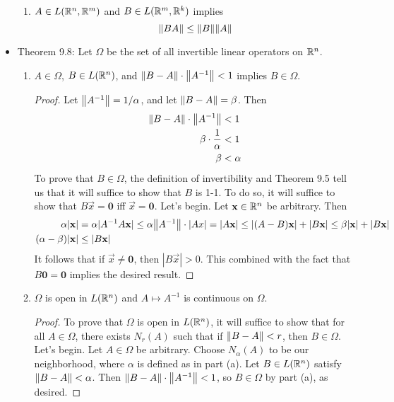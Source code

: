 \documentclass[../notes.tex]{subfiles}
\begin{document}
\begin{itemize}
\begin{enumerate}[label={(\alph*)}]
        \item $A\in L(\mathbb{R}^n,\mathbb{R}^m)$ and $B\in L(\mathbb{R}^m,\mathbb{R}^k)$ implies
        \begin{equation*}
            \norm{BA} \leq \norm{B}\norm{A}
        \end{equation*}
    \end{enumerate}
    \item Theorem 9.8: Let $\Omega$ be the set of all invertible linear operators on $\mathbb{R}^n$.
    \begin{enumerate}[label={(\alph*)}]
        \item $A\in\Omega$, $B\in L(\mathbb{R}^n)$, and $\norm{B-A}\cdot\norm{A^{-1}}<1$ implies $B\in\Omega$.
        \begin{proof}
            Let $\norm{A^{-1}}=1/\alpha$, and let $\norm{B-A}=\beta$. Then
            \begin{align*}
                \norm{B-A}\cdot\norm{A^{-1}} &< 1\\
                \beta\cdot\frac{1}{\alpha} &< 1\\
                \beta &< \alpha
            \end{align*}
            To prove that $B\in\Omega$, the definition of invertibility and Theorem 9.5 tell us that it will suffice to show that $B$ is 1-1. To do so, it will suffice to show that $B\vec{x}=\bm{0}$ iff $\vec{x}=\bm{0}$. Let's begin. Let $\mathbf{x}\in\mathbb{R}^n$ be arbitrary. Then
            \begin{align*}
                \alpha|\mathbf{x}| &= \alpha|A^{-1}A\mathbf{x}|
                    \leq \alpha\norm{A^{-1}}\cdot|Ax|
                    = |A\mathbf{x}|
                    \leq |(A-B)\mathbf{x}|+|B\mathbf{x}|
                    \leq \beta|\mathbf{x}|+|B\mathbf{x}|\\
                (\alpha-\beta)|\mathbf{x}| &\leq |B\mathbf{x}|
            \end{align*}
            It follows that if $\vec{x}\neq\bm{0}$, then $|B\vec{x}|>0$. This combined with the fact that $B\bm{0}=\bm{0}$ implies the desired result.
        \end{proof}
        \item $\Omega$ is open in $L(\mathbb{R}^n)$ and $A\mapsto A^{-1}$ is continuous on $\Omega$.
        \begin{proof}
            To prove that $\Omega$ is open in $L(\mathbb{R}^n)$, it will suffice to show that for all $A\in\Omega$, there exists $N_r(A)$ such that if $\norm{B-A}<r$, then $B\in\Omega$. Let's begin. Let $A\in\Omega$ be arbitrary. Choose $N_\alpha(A)$ to be our neighborhood, where $\alpha$ is defined as in part (a). Let $B\in L(\mathbb{R}^n)$ satisfy $\norm{B-A}<\alpha$. Then $\norm{B-A}\cdot\norm{A^{-1}}<1$, so $B\in\Omega$ by part (a), as desired.\par

\end{proof}
\end{enumerate}
\end{itemize}
\end{document}
